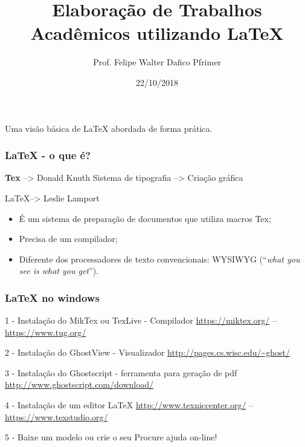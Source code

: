 \documentclass{beamer}
\title[Curso de \LaTeX]{Elaboração de Trabalhos Acadêmicos utilizando LaTeX}
\author[F. Pfrimer]{Prof. Felipe Walter Dafico Pfrimer}
\institute[UTFPR]{Universidade Tecnológica Federal do Paraná}
\date{22/10/2018}
\begin{document}
\begin{frame}
  \titlepage

  \begin{center}
    Uma visão básica de \LaTeX{} abordada de forma prática.
  \end{center}
\end{frame}

\begin{frame}
  \frametitle{\LaTeX{} - o que é?}
  \pause
  \begin{block}{\textbf{Tex} --> Donald Knuth}
    Sistema de tipografia --> Criação gráfica 
  \end{block}
  \pause
  \begin{block}{\LaTeX --> Leslie Lamport}
    \begin{itemize}
        \pause
        \item  É um sistema de preparação de documentos que utiliza macros Tex;
        \pause
        \item  Precisa de um compilador;
        \pause
        \item  Diferente dos processadores de texto convencionais: WYSIWYG (``\textit{what you see is what you get}'').
    \end{itemize}
  \end{block}
\end{frame}

\begin{frame}
    \frametitle{\LaTeX{} no windows}
    \pause
    \begin{block}{1 - Instalação do MikTex ou TexLive - Compilador}
        \url{https://miktex.org/} -- \url{https://www.tug.org/}
    \end{block}
    \pause
    \begin{block}{2 - Instalação do GhostView - Visualizador}
        \url{http://pages.cs.wisc.edu/~ghost/}
    \end{block}
    \pause    
    \begin{block}{3 - Instalação do Ghostscript - ferramenta para geração de pdf}
        \url{http://www.ghostscript.com/download/}
    \end{block}
    \pause    
    \begin{block}{4 - Instalação de um editor \LaTeX{}}
        \url{http://www.texniccenter.org/} -- \url{https://www.texstudio.org/}
    \end{block}
    \pause    
    \begin{block}{5 - Baixe um modelo ou crie o seu}
        Procure ajuda on-line!
    \end{block}
\end{frame}
\end{document}
